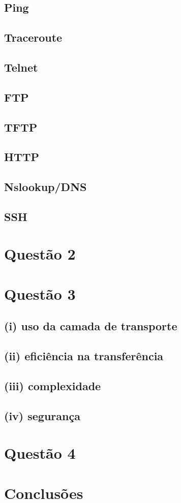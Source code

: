 \documentclass{llncs}
\begin{document}
\subsection{Ping}

\subsection{Traceroute}

\subsection{Telnet}

\subsection{FTP}

\subsection{TFTP}

\subsection{HTTP}

\subsection{Nslookup/DNS}

\subsection{SSH}


\section{Questão 2}

\section{Questão 3}
\subsection{(i) uso da camada de transporte}

\subsection{(ii) eficiência na transferência}

\subsection{(iii) complexidade}

\subsection{(iv) segurança}


\section{Questão 4}

\section{Conclusões}
\end{document}
